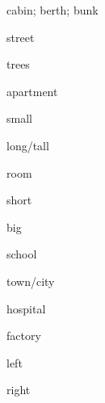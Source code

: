 \begin{flashcard}{\LARGE cabin; berth; bunk}
\LARGE {}
\end{flashcard}
\begin{flashcard}{\LARGE street}
\LARGE {}
\end{flashcard}
\begin{flashcard}{\LARGE trees}
\LARGE {}
\end{flashcard}
\begin{flashcard}{\LARGE apartment}
\LARGE {}
\end{flashcard}
\begin{flashcard}{\LARGE small}
\LARGE {}
\end{flashcard}
\begin{flashcard}{\LARGE long/tall}
\LARGE {}
\end{flashcard}
\begin{flashcard}{\LARGE room}
\LARGE {}
\end{flashcard}
\begin{flashcard}{\LARGE short}
\LARGE {}
\end{flashcard}
\begin{flashcard}{\LARGE big}
\LARGE {}
\end{flashcard}
\begin{flashcard}{\LARGE school}
\LARGE {}
\end{flashcard}
\begin{flashcard}{\LARGE town/city}
\LARGE {}
\end{flashcard}
\begin{flashcard}{\LARGE hospital}
\LARGE {}
\end{flashcard}
\begin{flashcard}{\LARGE factory}
\LARGE {}
\end{flashcard}
\begin{flashcard}{\LARGE left}
\LARGE {}
\end{flashcard}
\begin{flashcard}{\LARGE right}
\LARGE {}
\end{flashcard}
